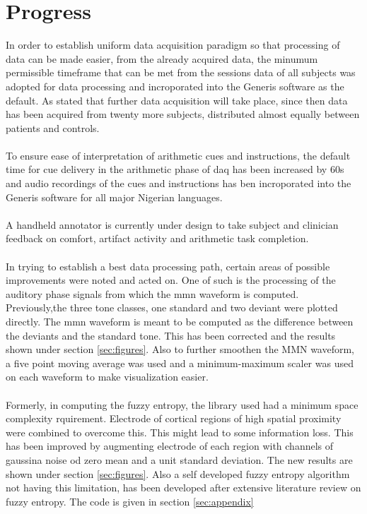 \documentclass[10pt]{article}
\begin{document}
\section{Progress}
In order to establish uniform data acquisition paradigm so that processing of data can be made 
easier, from the already acquired data, the minumum permissible timeframe that can be met from 
the sessions data of all subjects was adopted for data processing and incroporated into the 
Generis software as the default. As stated that further data acquisition will take place, 
since then data has been acquired from twenty more subjects, distributed almost equally between 
patients and controls.\\
\\
To ensure ease of interpretation of arithmetic cues and instructions, the default time for cue 
delivery in the arithmetic phase of \gls{daq} has been increased by 60s and audio recordings of 
the cues and instructions has ben incroporated into the Generis software for all major Nigerian 
languages.\\
\\
A handheld annotator is currently under design to take subject and clinician feedback on comfort, 
artifact activity and arithmetic task completion.\\
\\In trying to establish a best data processing path, certain areas of possible improvements were 
noted and acted on. One of such is the processing of the auditory phase signals from which the \gls{mmn} 
waveform is computed. Previously,the three tone classes, one standard and two 
deviant were plotted directly. The \gls{mmn} waveform is meant to be computed as the difference between 
the deviants and the standard tone. This has been corrected and the results shown under section \ref{sec:figures}.
Also to further smoothen the MMN waveform, a five point moving average was used and a minimum-maximum 
scaler was used on each waveform to make visualization easier.\\
\\
Formerly, in computing the fuzzy entropy, the library used had a minimum space complexity rquirement. 
Electrode of cortical regions of high spatial proximity were combined to overcome this. This might 
lead to some information loss. This has been improved by augmenting electrode of each region with channels 
of gaussina noise od zero mean and a unit standard deviation. The new results are shown under 
section \ref{sec:figures}. Also a self developed fuzzy entropy algorithm not having this limitation, has 
been developed after extensive literature review on fuzzy entropy. The code is given in section 
\ref{sec:appendix}
\end{document}
